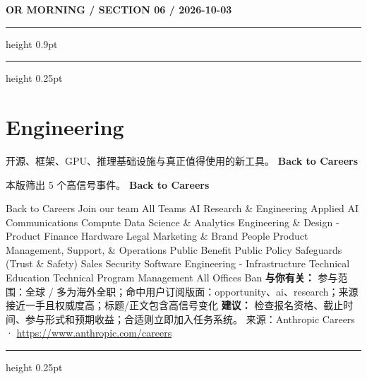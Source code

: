 \documentclass[10.5pt]{ctexart}
\begin{document}
\newpage
{\small\bfseries OR MORNING / SECTION 06 / 2026-10-03}
\vspace{2mm}
\hrule height 0.9pt
\vspace{1.5mm}
\hrule height 0.25pt
\vspace{4mm}
\section*{Engineering}
{\color{ormuted} 开源、框架、GPU、推理基础设施与真正值得使用的新工具。}
\vspace{2mm}
{\LARGE\bfseries Back to Careers}\par
\vspace{1mm}
{\color{ormuted} 本版筛出 5 个高信号事件。}
\vspace{3mm}
{\Large\bfseries Back to Careers}\par
Back to Careers Join our team All Teams AI Research \& Engineering Applied AI Communications Compute Data Science \& Analytics Engineering \& Design - Product Finance Hardware Legal Marketing \& Brand People Product Management, Support, \& Operations Public Benefit Public Policy Safeguards (Trust \& Safety) Sales Security Software Engineering - Infrastructure Technical Education Technical Program Management All Offices Ban
\textbf{与你有关：} 参与范围：全球 / 多为海外全职；命中用户订阅版面：opportunity、ai、research；来源接近一手且权威度高；标题/正文包含高信号变化
\textbf{建议：} 检查报名资格、截止时间、参与形式和预期收益；合适则立即加入任务系统。
{\footnotesize\color{ormuted} 来源：Anthropic Careers · \url{https://www.anthropic.com/careers}}
\vspace{4mm}
\hrule height 0.25pt
\vspace{3mm}
\end{document}
